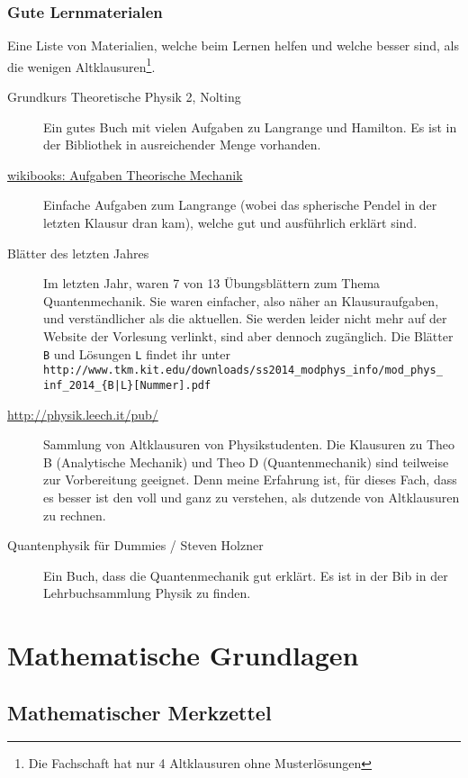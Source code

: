 \documentclass[oneside]{book}
\theoremstyle{definition}
\begin{document}
\subsection{Gute Lernmaterialen}
Eine Liste von Materialien, welche beim Lernen helfen und welche besser sind, als die wenigen Altklausuren\footnote{Die Fachschaft hat nur 4 Altklausuren ohne Musterlösungen}.
\begin{description}
	\item[Grundkurs Theoretische Physik 2, Nolting] Ein gutes Buch mit vielen Aufgaben zu Langrange und Hamilton. Es ist in der Bibliothek in ausreichender Menge vorhanden.
	\item[\href{https://de.wikibooks.org/wiki/Aufgabensammlung_Physik:_Theoretische_Mechanik}{wikibooks: Aufgaben Theorische Mechanik}] Einfache Aufgaben zum Langrange (wobei das spherische Pendel in der letzten Klausur dran kam), welche gut und ausführlich erklärt sind.
	\item[Blätter des letzten Jahres] Im letzten Jahr, waren 7 von 13 Übungsblättern zum Thema Quantenmechanik. Sie waren einfacher, also näher an Klausuraufgaben, und verständlicher als die aktuellen. Sie werden leider nicht mehr auf der Website der Vorlesung verlinkt, sind aber dennoch zugänglich. Die Blätter \verb|B| und Lösungen \verb|L| findet ihr unter\\ \verb-http://www.tkm.kit.edu/downloads/ss2014_modphys_info/mod_phys_- \verb-inf_2014_{B|L}[Nummer].pdf-
	\item[\href{http://physik.leech.it/pub/}{http://physik.leech.it/pub/}] Sammlung von Altklausuren von Physikstudenten. Die Klausuren zu Theo B (Analytische Mechanik) und Theo D (Quantenmechanik) sind teilweise zur Vorbereitung geeignet. Denn meine Erfahrung ist, für dieses Fach, dass es besser ist den voll und ganz zu verstehen, als dutzende von Altklausuren zu rechnen.
	\item[Quantenphysik für Dummies / Steven Holzner] Ein Buch, dass die Quantenmechanik gut erklärt. Es ist in der Bib in der Lehrbuchsammlung Physik zu finden.
\end{description}

\chapter{Mathematische Grundlagen}

\section{Mathematischer Merkzettel}
\end{document}
